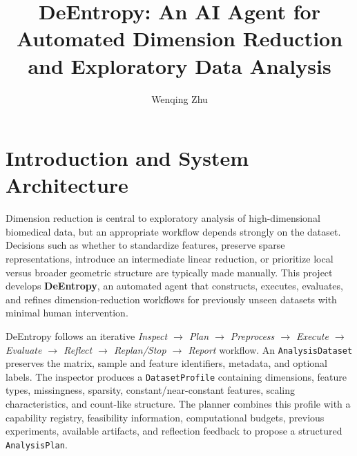 \documentclass[10pt]{article}
\title{\vspace{-1.4em}\textbf{DeEntropy: An AI Agent for Automated Dimension Reduction and Exploratory Data Analysis}\vspace{-0.6em}}
\author{Wenqing Zhu}
\date{}
\begin{document}
\maketitle
\vspace{-2.2em}

\section{Introduction and System Architecture}

Dimension reduction is central to exploratory analysis of high-dimensional
biomedical data, but an appropriate workflow depends strongly on the dataset.
Decisions such as whether to standardize features, preserve sparse
representations, introduce an intermediate linear reduction, or prioritize
local versus broader geometric structure are typically made manually. This
project develops \textbf{DeEntropy}, an automated agent that constructs,
executes, evaluates, and refines dimension-reduction workflows for previously
unseen datasets with minimal human intervention.

DeEntropy follows an iterative
\textit{Inspect $\rightarrow$ Plan $\rightarrow$ Preprocess $\rightarrow$
Execute $\rightarrow$ Evaluate $\rightarrow$ Reflect $\rightarrow$
Replan/Stop $\rightarrow$ Report} workflow. An \texttt{AnalysisDataset}
preserves the matrix, sample and feature identifiers, metadata, and optional
labels. The inspector produces a \texttt{DatasetProfile} containing dimensions,
feature types, missingness, sparsity, constant/near-constant features, scaling
characteristics, and count-like structure. The planner combines this profile
with a capability registry, feasibility information, computational budgets,
previous experiments, available artifacts, and reflection feedback to propose
a structured \texttt{AnalysisPlan}.
\end{document}
